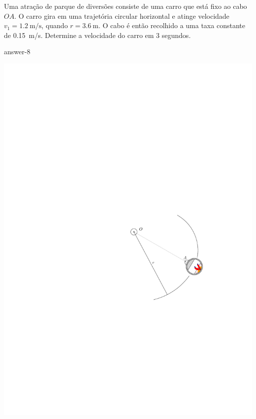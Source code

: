 \item Uma atração de parque de diversões consiste de uma carro que está fixo ao cabo $OA$. O carro gira em uma trajetória circular horizontal e atinge velocidade $v_{1}=\SI{1.2}{\meter/\second}$, quando $r=\SI{3.6}{\meter}$. O cabo é então recolhido a uma taxa constante de \SI{.15}{\meter/\second}. Determine a velocidade do carro em 3 segundos.

{answer-8}

\vspace{-1cm}
\begin{flushright}
	\includegraphics[scale=1.3]{images/draw_8}
\end{flushright}